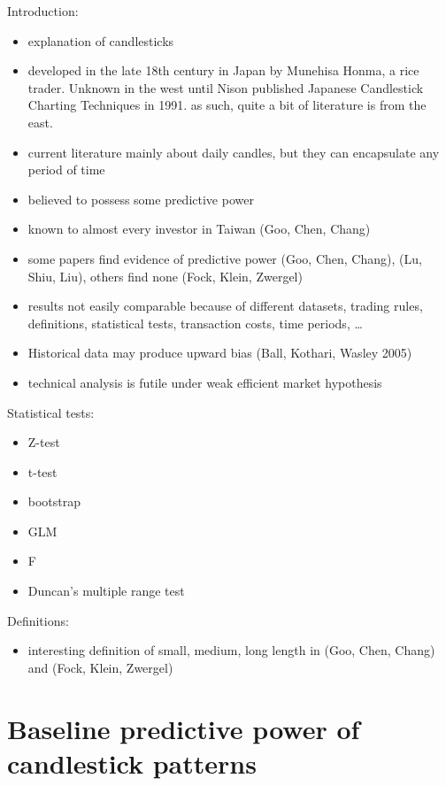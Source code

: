\documentclass[
  12pt,
  a4paper,
  oneside]{book}
\providecommand{\tightlist}{%
  \setlength{\itemsep}{0pt}\setlength{\parskip}{0pt}}
\begin{document}
Introduction:

\begin{itemize}
\item
  explanation of candlesticks
\item
  developed in the late 18th century in Japan by Munehisa Honma, a rice trader. Unknown in the west until Nison published Japanese Candlestick Charting Techniques in 1991. as such, quite a bit of literature is from the east.
\item
  current literature mainly about daily candles, but they can encapsulate any period of time
\item
  believed to possess some predictive power
\item
  known to almost every investor in Taiwan (Goo, Chen, Chang)
\item
  some papers find evidence of predictive power (Goo, Chen, Chang), (Lu, Shiu, Liu), others find none (Fock, Klein, Zwergel)
\item
  results not easily comparable because of different datasets, trading rules, definitions, statistical tests, transaction costs, time periods, \ldots{}
\item
  Historical data may produce upward bias (Ball, Kothari, Wasley 2005)
\item
  technical analysis is futile under weak efficient market hypothesis
\end{itemize}

Statistical tests:

\begin{itemize}
\item
  Z-test
\item
  t-test
\item
  bootstrap
\item
  GLM
\item
  F
\item
  Duncan's multiple range test
\end{itemize}

Definitions:

\begin{itemize}
\tightlist
\item
  interesting definition of small, medium, long length in (Goo, Chen, Chang) and (Fock, Klein, Zwergel)
\end{itemize}

\chapter{Baseline predictive power of candlestick patterns}\label{baseline-predictive-power-of-candlestick-patterns}
\end{document}
